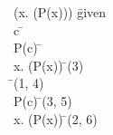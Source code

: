 \documentclass{article}
\begin{document}
\begin{proofbox}
\: \lnot (\exists x. (P(x))) \= \hbox{given} \\
\open
\: c \= \forallintroconst \\
\open
\: P(c) \= \asm \\
\: \exists x. (P(x)) \= \existsintro(3) \\
\: \bot \= \notelim(1, 4) \\
\close
\: \lnot P(c) \= \notintro(3, 5) \\
\close
\: \forall x. (\lnot P(x)) \= \forallintro(2, 6) \\
\end{proofbox}
\end{document}
